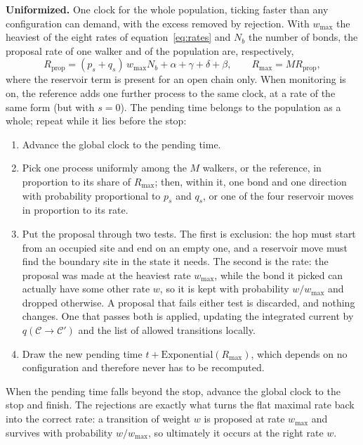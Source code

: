 \documentclass[11pt]{article}
\begin{document}
\begin{mdframed}[
    linewidth=0.8pt,
    roundcorner=3pt,
    backgroundcolor=black!5,
    innerleftmargin=8pt,
    innerrightmargin=8pt,
    innertopmargin=8pt,
    innerbottommargin=8pt]
\begin{enumerate}
\smallskip
\noindent\textcolor{unifcol}{\textbf{Uniformized.}} One clock for the whole population, ticking faster than any configuration can demand, with the excess removed by rejection. With $w_{\max}$ the heaviest of the eight rates of equation~\ref{eq:rates} and $N_b$ the number of bonds, the proposal rate of one walker and of the population are, respectively,
\begin{equation}
    R_{\text{prop}} = (p_s + q_s)\, w_{\max} N_b
      + \alpha + \gamma + \delta + \beta,
    \qquad
    R_{\max} = M R_{\text{prop}},
    \label{eq:uniformized-rate}
\end{equation}
where the reservoir term is present for an open chain only. When monitoring is on, the reference adds one further process to the same clock, at a rate of the same form (but with $s=0$). The pending time belongs to the population as a whole; repeat while it lies before the stop:
\begin{enumerate}
\item Advance the global clock to the pending time.
\item Pick one process uniformly among the $M$ walkers, or the reference, in proportion to its share of $R_{\max}$; then, within it, one bond and one direction with probability proportional to $p_s$ and $q_s$, or one of the four reservoir moves in proportion to its rate.
\item Put the proposal through two tests. The first is exclusion: the hop must start from an occupied site and end on an empty one, and a reservoir move must find the boundary site in the state it needs. The second is the rate: the proposal was made at the heaviest rate $w_{\max}$, while the bond it picked can actually have some other rate $w$, so it is kept with probability $w/w_{\max}$ and dropped otherwise. A proposal that fails either test is discarded, and nothing changes. One that passes both is applied, updating the integrated current by $q(\mathcal{C}\to\mathcal{C}')$ and the list of allowed transitions locally.
\item Draw the new pending time $t + \text{Exponential}(R_{\max})$, which depends on no configuration and therefore never has to be recomputed.
\end{enumerate}
When the pending time falls beyond the stop, advance the global clock to the stop and finish. The rejections are exactly what turns the flat maximal rate back into the correct rate: a transition of weight $w$ is proposed at rate $w_{\max}$ and survives with probability $w/w_{\max}$, so ultimately it occurs at the right rate $w$.


\end{enumerate}
\end{mdframed}
\end{document}
